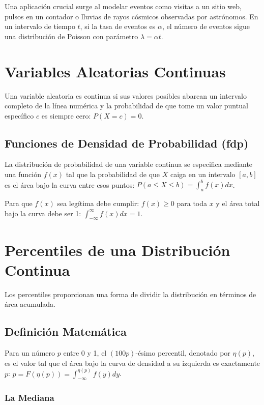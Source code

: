 \documentclass[a4paper]{article}
\begin{document}
Una aplicación crucial surge al modelar eventos como visitas a un sitio web, pulsos en un contador o lluvias de rayos cósmicos observadas por astrónomos. En un intervalo de tiempo $t$, si la tasa de eventos es $\alpha$, el número de eventos sigue una distribución de Poisson con parámetro $\lambda = \alpha t$.

\section{Variables Aleatorias Continuas}

Una variable aleatoria es continua si sus valores posibles abarcan un intervalo completo de la línea numérica y la probabilidad de que tome un valor puntual específico $c$ es siempre cero: $P(X = c) = 0$.

\subsection{Funciones de Densidad de Probabilidad (fdp)}

La distribución de probabilidad de una variable continua se especifica mediante una función $f(x)$ tal que la probabilidad de que $X$ caiga en un intervalo $[a, b]$ es el área bajo la curva entre esos puntos:
$P(a \leq X \leq b) = \int_{a}^{b} f(x) dx$.

Para que $f(x)$ sea legítima debe cumplir: $f(x) \geq 0$ para toda $x$ y el área total bajo la curva debe ser 1: $\int_{-\infty}^{\infty} f(x) dx = 1$.

\section{Percentiles de una Distribución Continua}

Los percentiles proporcionan una forma de dividir la distribución en términos de área acumulada.

\subsection{Definición Matemática}

Para un número $p$ entre 0 y 1, el $(100p)$-ésimo percentil, denotado por $\eta(p)$, es el valor tal que el área bajo la curva de densidad a su izquierda es exactamente $p$:
$p = F(\eta(p)) = \int_{-\infty}^{\eta(p)} f(y) dy$.

\subsubsection{La Mediana}
\end{document}
